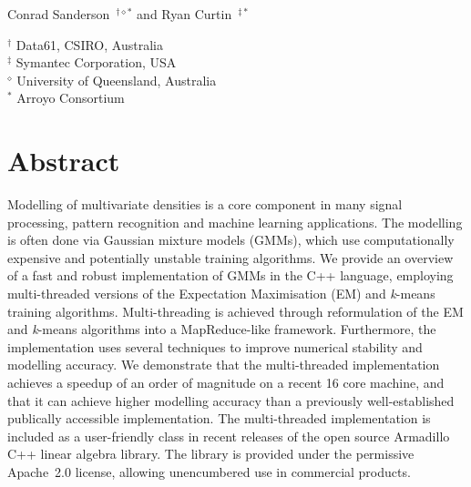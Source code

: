 \documentclass[10pt,a4paper]{article}
\renewcommand{\baselinestretch}{1.1}\small\normalsize
\begin{document}
\pagestyle{empty}
\lhead{}
\chead{}
\rhead{}
\lfoot{}
\cfoot{}
\rfoot{}



\begin{center}
{\Large\bf\doctitle}
\end{center}
\vspace{1ex}
\begin{center}

\begin{minipage}{0.5\textwidth}
{\large Conrad Sanderson~{$^{\dagger\diamond\ast}$} and Ryan Curtin~{$^{\ddagger\ast}$}}\\

\begin{small}
{$^\dagger$}  Data61, CSIRO, Australia\\
{$^\ddagger$} Symantec Corporation, USA\\
{$^\diamond$} University of Queensland, Australia\\
{$^\ast$}     Arroyo Consortium
\end{small}
\end{minipage}
\end{center}



\section*{Abstract}

\renewcommand{\baselinestretch}{1.0}\small\normalsize
\begin{small}
Modelling of multivariate densities is a core component in many signal processing, pattern recognition and machine learning applications.
The modelling is often done via Gaussian mixture models (GMMs), which use computationally expensive and potentially unstable training algorithms.
We provide an overview of a fast and robust implementation of GMMs in the C++ language,
employing multi-threaded versions of the Expectation Maximisation (EM) and \mbox{{\it k}-means} training algorithms.
Multi-threading is achieved through reformulation of the EM and \mbox{{\it k}-means} algorithms into a MapReduce-like framework.
Furthermore, the implementation uses several techniques to improve numerical stability and modelling accuracy.
We demonstrate that the multi-threaded implementation achieves a speedup of an order of magnitude on a recent 16 core machine,
and that it can achieve higher modelling accuracy than a previously well-established publically accessible implementation.
The multi-threaded implementation is included as a user-friendly class in recent releases of the open source Armadillo C++ linear algebra library.
The library is provided under the permissive Apache~2.0 license, allowing unencumbered use in commercial products.
\end{small}
\renewcommand{\baselinestretch}{1.1}\small\normalsize
\end{document}
